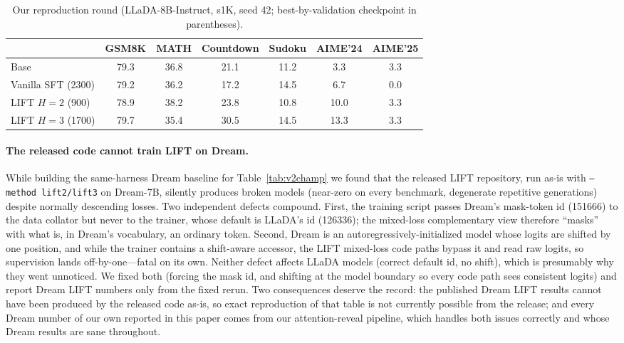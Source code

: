 \documentclass{article} %
\begin{document}
\begin{table}[h]
\caption{Our reproduction round (LLaDA-8B-Instruct, s1K, seed 42; best-by-validation checkpoint in parentheses).}
\label{tab:repro}
\begin{center}
\begin{tabular}{lcccccc}
\toprule
 & GSM8K & MATH & Countdown & Sudoku & AIME'24 & AIME'25 \\
\midrule
Base                    & 79.3 & 36.8 & 21.1 & 11.2 & 3.3 & 3.3 \\
Vanilla SFT (2300)      & 79.2 & 36.2 & 17.2 & 14.5 & 6.7 & 0.0 \\
LIFT $H{=}2$ (900)      & 78.9 & 38.2 & 23.8 & 10.8 & 10.0 & 3.3 \\
LIFT $H{=}3$ (1700)     & 79.7 & 35.4 & 30.5 & 14.5 & 13.3 & 3.3 \\
\bottomrule
\end{tabular}
\end{center}
\end{table}

\paragraph{The released code cannot train LIFT on Dream.} While building the same-harness Dream baseline for Table~\ref{tab:v2champ} we found that the released LIFT repository, run as-is with \texttt{--method lift2/lift3} on Dream-7B, silently produces broken models (near-zero on every benchmark, degenerate repetitive generations) despite normally descending losses. Two independent defects compound. First, the training script passes Dream's mask-token id (151666) to the data collator but never to the trainer, whose default is LLaDA's id (126336); the mixed-loss complementary view therefore ``masks'' with what is, in Dream's vocabulary, an ordinary token. Second, Dream is an autoregressively-initialized model whose logits are shifted by one position, and while the trainer contains a shift-aware accessor, the LIFT mixed-loss code paths bypass it and read raw logits, so supervision lands off-by-one---fatal on its own. Neither defect affects LLaDA models (correct default id, no shift), which is presumably why they went unnoticed. We fixed both (forcing the mask id, and shifting at the model boundary so every code path sees consistent logits) and report Dream LIFT numbers only from the fixed rerun. Two consequences deserve the record: the published Dream LIFT results cannot have been produced by the released code as-is, so exact reproduction of that table is not currently possible from the release; and every Dream number of our own reported in this paper comes from our attention-reveal pipeline, which handles both issues correctly and whose Dream results are sane throughout.
\end{document}
